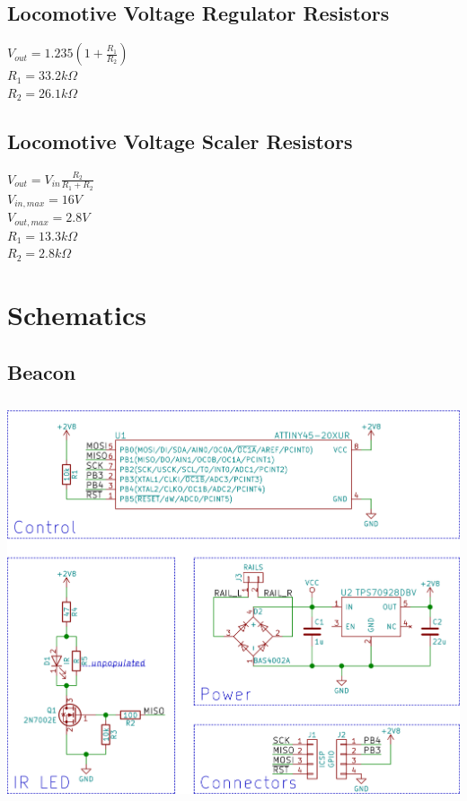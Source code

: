 \documentclass[openbib,letterpaper,10pt]{article}
\begin{document}
\begin{spacing}{1.15}
\begin{appendix}
\subsection{Locomotive Voltage Regulator Resistors}
$V_{out}=1.235(1+\frac{R_1}{R_2})$ \\
$R_1=33.2k\Omega$ \\
$R_2=26.1k\Omega$

\subsection{Locomotive Voltage Scaler Resistors}
$V_{out}=V_{in}\frac{R_2}{R_1+R_2}$ \\
$V_{in,max}=16V$ \\
$V_{out,max}=2.8V$ \\
$R_1=13.3k\Omega$ \\
$R_2=2.8k\Omega$

\clearpage

\section{Schematics}

\subsection{Beacon}
\begin{center}
\includegraphics[height=32em]{../electronics/beacon/v1.1/images/beacon-sch-small.png}
\end{center}


\end{appendix}
\end{spacing}
\end{document}
